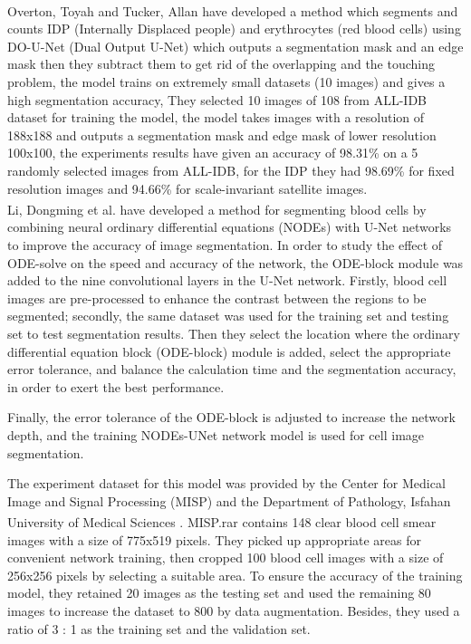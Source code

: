 Overton, Toyah and Tucker, Allan \textsuperscript{\cite{10.1007/978-3-030-44584-3_31}} have developed a method which segments and counts IDP (Internally Displaced people) and erythrocytes (red blood cells) using DO-U-Net (Dual Output U-Net) which outputs a segmentation mask and an edge mask then they subtract them to get rid of the overlapping and the touching problem, the model trains on extremely small datasets (10 images) and gives a high segmentation accuracy, They selected 10 images of 108 from ALL-IDB dataset for training the model, the model takes images with a resolution of 188x188 and outputs a segmentation mask and edge mask of lower resolution 100x100, the experiments results have given an accuracy of 98.31\% on a 5 randomly selected images from ALL-IDB, for the IDP they had 98.69\% for fixed resolution images and 94.66\% for scale-invariant satellite images.\\

Li, Dongming et al. \textsuperscript{\cite{li2021robust}} have developed a method for segmenting blood cells by combining neural ordinary differential equations (NODEs) with U-Net networks to improve the accuracy of image segmentation. In order to study the effect of ODE-solve on the speed and accuracy of the network, the ODE-block module was added to the nine convolutional layers in the U-Net network. Firstly, blood cell images are pre-processed to enhance the contrast between the regions to be segmented; secondly, the same dataset was used for the training set and testing set to test segmentation results. Then they select the location where the ordinary differential equation block (ODE-block) module is added, select the appropriate error tolerance, and balance the calculation time and the segmentation accuracy, in order to exert the best performance.\

Finally, the error tolerance of the ODE-block is adjusted to increase the network depth, and the training NODEs-UNet network model is used for cell image segmentation. 

The experiment dataset for this model was provided by the Center for Medical Image and Signal Processing (MISP) and the Department of Pathology, Isfahan University of Medical Sciences \textsuperscript{\cite{sarrafzadeh2014selection}}. MISP.rar contains 148 clear blood cell smear images with a size of 775x519 pixels. They picked up appropriate areas for convenient network training, then cropped 100 blood cell images with a size of 256x256 pixels by selecting a suitable area. To ensure the accuracy of the training model, they retained 20 images as the testing set and used the remaining 80 images to increase the dataset to 800 by data augmentation. Besides, they used a ratio of 3 : 1 as the training set and the validation set.

